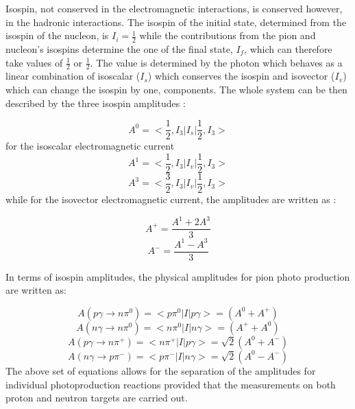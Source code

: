 \indent Isospin, not conserved in the electromagnetic interactions, is conserved however, in the hadronic interactions. The isospin of the initial state, determined from the isospin of the nucleon, is $I_{i}=\frac{1}{2}$ while the contributions from the pion and nucleon's isospins determine the one of the final state, $I_{f}$, which can therefore take values of $\frac{1}{2}$ or $\frac{1}{2}$. The value is determined by the photon which behaves as a linear combination of isoscalar ($I_{s}$) which conserves the isospin and isovector ($I_{v}$) which can change the isospin by one, components. The whole system can be then described by the three isospin amplitudes \cite{nagl}:

\begin{equation}
A^{0}=<\frac{1}{2},I_{3}|I_{s}|\frac{1}{2},I_{3}>
\end{equation}
for the isoscalar electromagnetic current
\begin{equation}
A^{1}=<\frac{1}{2},I_{3}|I_{v}|\frac{1}{2},I_{3}>
\end{equation}
\begin{equation}
A^{3}=<\frac{3}{2},I_{3}|I_{v}|\frac{1}{2},I_{3}>
\end{equation}
while for the isovector electromagnetic current, the amplitudes are written as \cite{davidson}:

\begin{equation}
A^{+}=\frac{A^{1}+2A^{3}}{3}
\end{equation}
\begin{equation}
A^{-}=\frac{A^{1}-A^{3}}{3}
\end{equation}

\indent In terms of isospin amplitudes, the physical amplitudes for pion photo production are written as:

\begin{equation}
A(p\gamma \rightarrow n\pi^{0})=<p\pi^{0}|I|p\gamma>=(A^{0}+A^{+})
\end{equation}
\begin{equation}
A(n\gamma \rightarrow n\pi^{0})=<n\pi^{0}|I|n\gamma>=(A^{+}+A^{0})
\end{equation}
\begin{equation}
A(p\gamma \rightarrow n\pi^{+})=<n\pi^{+}|I|p\gamma>=\sqrt{2}(A^{0}+A^{-})
\end{equation}
\begin{equation}
A(n\gamma \rightarrow p\pi^{-})=<p\pi^{-}|I|n\gamma>=\sqrt{2}(A^{0}-A^{-})
\end{equation}
The above set of equations allows for the separation of the amplitudes for individual photoproduction reactions provided that the measurements on both proton and neutron targets are carried out.

